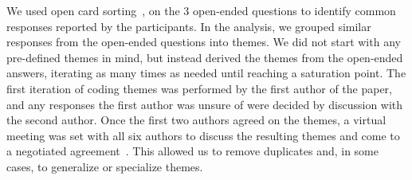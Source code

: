 
We used open card sorting~\cite{zimmermann2016card}, on the 3 open-ended questions to identify common responses reported by the participants.
In the analysis, we grouped similar responses from the open-ended questions into themes.
We did not start with any pre-defined themes in mind, but instead derived the themes from the open-ended answers, iterating as many times as needed until reaching a saturation point. The first iteration of coding themes was performed by the first author of the paper, and any responses the first author was unsure of were decided by discussion with the second author. Once the first two authors agreed on the themes, a virtual meeting was set with all six authors to discuss the resulting themes and come to a negotiated agreement~\cite{Garrison:2006}. This  allowed us to remove duplicates and, in some cases, to generalize or specialize themes.
